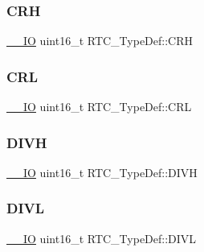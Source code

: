 \mbox{\label{struct_r_t_c___type_def_aad5162f4b5b15deb174479e8e543db82}} 
\subsubsection{\texorpdfstring{CRH}{CRH}}
{\footnotesize\ttfamily \mbox{\hyperlink{group___c_m_s_i_s___c_m3__core__definitions_gaec43007d9998a0a0e01faede4133d6be}{\+\_\+\+\_\+\+IO}} uint16\+\_\+t R\+T\+C\+\_\+\+Type\+Def\+::\+C\+RH}

\mbox{\label{struct_r_t_c___type_def_a95b9e1ed044a4e1cc3632326e7250767}} 
\subsubsection{\texorpdfstring{CRL}{CRL}}
{\footnotesize\ttfamily \mbox{\hyperlink{group___c_m_s_i_s___c_m3__core__definitions_gaec43007d9998a0a0e01faede4133d6be}{\+\_\+\+\_\+\+IO}} uint16\+\_\+t R\+T\+C\+\_\+\+Type\+Def\+::\+C\+RL}

\mbox{\label{struct_r_t_c___type_def_a224b675d0ecad8b6e26d9e4c32691a18}} 
\subsubsection{\texorpdfstring{DIVH}{DIVH}}
{\footnotesize\ttfamily \mbox{\hyperlink{group___c_m_s_i_s___c_m3__core__definitions_gaec43007d9998a0a0e01faede4133d6be}{\+\_\+\+\_\+\+IO}} uint16\+\_\+t R\+T\+C\+\_\+\+Type\+Def\+::\+D\+I\+VH}

\mbox{\label{struct_r_t_c___type_def_ad0c75a7cc4e925da0faedcd8860cb43a}} 
\subsubsection{\texorpdfstring{DIVL}{DIVL}}
{\footnotesize\ttfamily \mbox{\hyperlink{group___c_m_s_i_s___c_m3__core__definitions_gaec43007d9998a0a0e01faede4133d6be}{\+\_\+\+\_\+\+IO}} uint16\+\_\+t R\+T\+C\+\_\+\+Type\+Def\+::\+D\+I\+VL}


